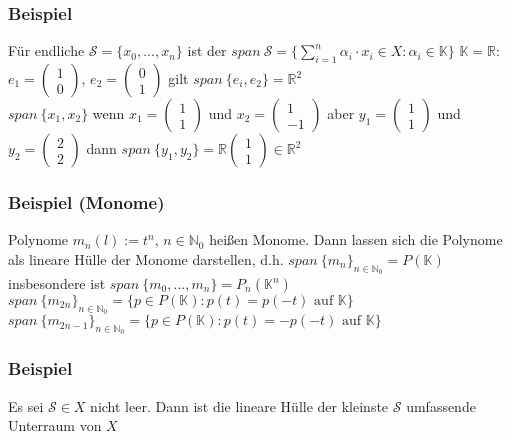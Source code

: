 \subsubsection{Beispiel}
Für endliche $\mathcal{S}=\{x_0,...,x_n\}$ ist der $\displaystyle span\ \mathcal{S}=\{\sum^n_{i=1} \alpha_i\cdot x_i\in X: \alpha_i \in \mathbb{K}\}$ $\mathbb{K}=\mathbb{R}$: $e_1=\begin{pmatrix}1\\0\end{pmatrix}$, $e_2=\begin{pmatrix}0\\1\end{pmatrix}$ gilt $span\ \{e_i,e_2\}=\mathbb{R}^2$\\
$span\ \{x_1,x_2\}$ wenn $x_1=\begin{pmatrix}1\\1\end{pmatrix}$ und $x_2=\begin{pmatrix}1\\-1\end{pmatrix}$ aber $y_1=\begin{pmatrix}1\\1\end{pmatrix}$ und $y_2=\begin{pmatrix}2\\2\end{pmatrix}$ dann $span\ \{y_1,y_2\} = \mathbb{R} \begin{pmatrix}1\\1\end{pmatrix} \in \mathbb{R}^2$ 
\subsubsection{Beispiel (Monome)}
Polynome $m_n(l):=t^n$, $n\in\mathbb{N}_0$ heißen Monome. Dann lassen sich die Polynome als lineare Hülle der Monome darstellen, d.h. $span\ \{m_n\}_{n\in\mathbb{N}_0}=P(\mathbb{K})$ insbesondere ist $span\ \{m_0,...,m_n\}=P_n(\mathbb{K}^n)$\\
$span\ \{m_{2n}\}_{n\in\mathbb{N}_0}=\{p\in P(\mathbb{K}):p(t)=p(-t) \text{ auf } \mathbb{K}\}$\\
$span\ \{m_{2n-1}\}_{n\in\mathbb{N}_0}=\{p\in P(\mathbb{K}):p(t)=-p(-t) \text{ auf } \mathbb{K}\}$
\subsubsection{Beispiel}
Es sei $\mathcal{S}\in X$ nicht leer. Dann ist die lineare Hülle der kleinste $\mathcal{S}$ umfassende Unterraum von $X$\\
